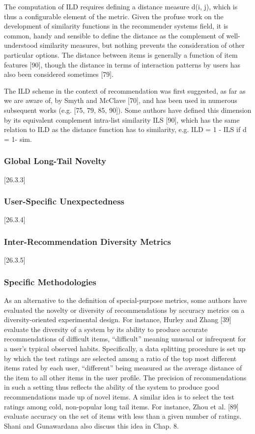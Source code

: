 The computation of ILD requires defining a distance measure d(i, j), which is thus a configurable element of the metric. Given the profuse work on the development of similarity functions in the recommender systems field, it is common, handy and sensible to define the distance as the complement of well-understood similarity measures, but nothing prevents the consideration of other particular options. The distance between items is generally a function of item features [90], though the distance in terms of interaction patterns by users has also been considered sometimes [79].


The ILD scheme in the context of recommendation was first suggested, as far as we are aware of, by Smyth and McClave [70], and has been used in numerous subsequent works (e.g. [75, 79, 85, 90]). Some authors have defined this dimension by its equivalent complement intra-list similarity ILS [90], which has the same relation to ILD as the distance function has to similarity, e.g. ILD = 1 - ILS if d = 1- sim.

\subsubsection{Global Long-Tail Novelty}
[26.3.3]

\subsubsection{User-Specific Unexpectedness}
[26.3.4]

\subsubsection{Inter-Recommendation Diversity Metrics}
[26.3.5]

\subsubsection{Specific Methodologies}

As an alternative to the definition of special-purpose metrics, some authors have evaluated the novelty or diversity of recommendations by accuracy metrics on a diversity-oriented experimental design. For instance, Hurley and Zhang [39] evaluate the diversity of a system by its ability to produce accurate recommendations of difficult items, “difficult” meaning unusual or infrequent for a user’s typical observed habits. Specifically, a data splitting procedure is set up by which the test ratings are selected among a ratio of the top most different items rated by each user, “different” being measured as the average distance of the item to all other items in the user profile. The precision of recommendations in such a setting thus reflects the ability of the system to produce good recommendations made up of novel items. A similar idea is to select the test ratings among cold, non-popular long tail items. For instance, Zhou et al. [89] evaluate accuracy on the set of items with less than a given number of ratings. Shani and Gunawardana also discuss this idea in Chap. 8.

